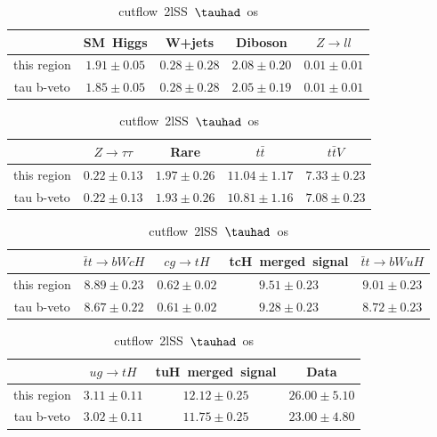 \begin{table}
\caption{cutflow~2lSS~$\tauhad$~os}
\centering
\begin{tabular}{|c|c|c|c|c|} \hline
 & SM~Higgs & W+jets & Diboson & $Z\to ll$\\\hline
this region & $1.91\pm0.05$ & $0.28\pm0.28$ & $2.08\pm0.20$ & $0.01\pm0.01$\\\hline
tau b-veto & $1.85\pm0.05$ & $0.28\pm0.28$ & $2.05\pm0.19$ & $0.01\pm0.01$\\\hline
\end{tabular}
\begin{tabular}{|c|c|c|c|c|} \hline
 & $Z\to \tau\tau$ & Rare & $t\bar{t}$ & $t\bar{t}V$\\\hline
this region & $0.22\pm0.13$ & $1.97\pm0.26$ & $11.04\pm1.17$ & $7.33\pm0.23$\\\hline
tau b-veto & $0.22\pm0.13$ & $1.93\pm0.26$ & $10.81\pm1.16$ & $7.08\pm0.23$\\\hline
\end{tabular}
\begin{tabular}{|c|c|c|c|c|} \hline
 & $\bar{t}t\to bWcH$ & $cg\to tH$ & tcH~merged~signal & $\bar{t}t\to bWuH$\\\hline
this region & $8.89\pm0.23$ & $0.62\pm0.02$ & $9.51\pm0.23$ & $9.01\pm0.23$\\\hline
tau b-veto & $8.67\pm0.22$ & $0.61\pm0.02$ & $9.28\pm0.23$ & $8.72\pm0.23$\\\hline
\end{tabular}
\begin{tabular}{|c|c|c|c|} \hline
 & $ug\to tH$ & tuH~merged~signal & Data\\\hline
this region & $3.11\pm0.11$ & $12.12\pm0.25$ & $26.00\pm5.10$\\\hline
tau b-veto & $3.02\pm0.11$ & $11.75\pm0.25$ & $23.00\pm4.80$\\\hline
\end{tabular}
\label{tab:cutflow_reg2lSS1tau1bnj_os}
\end{table}
